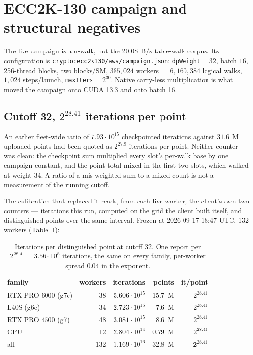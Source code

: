 \section{ECC2K-130 campaign and structural negatives}
\label{sec:campaign}

The live campaign is a $\sigma$-walk, not the $20.08$~B/s table-walk
corpus. Its configuration is \texttt{crypto:ecc2k130/aws/campaign.json}:
\texttt{dpWeight}${}=32$, batch $16$, 256-thread blocks, two blocks/SM,
$385{,}024$ workers ${}=6{,}160{,}384$ logical walks, $1{,}024$
steps/launch, \texttt{maxIters}${}=2^{30}$. Native carry-less
multiplication is what moved the campaign onto CUDA 13.3 and onto
batch 16.

\subsection{Cutoff 32, $2^{28.41}$ iterations per point}

An earlier fleet-wide ratio of $7.93\cdot 10^{15}$ checkpointed
iterations against $31.6$~M uploaded points had been quoted as
$2^{27.9}$ iterations per point. Neither counter was clean: the
checkpoint sum multiplied every slot's per-walk base by one campaign
constant, and the point total mixed in the first two slots, which
walked at weight 34. A ratio of a mis-weighted sum to a mixed count
is not a measurement of the running cutoff.

The calibration that replaced it reads, from each live worker, the
client's own two counters --- iterations this run, computed on the
grid the client built itself, and distinguished points over the same
interval. Frozen at 2026-09-17 18:47 UTC, 132 workers
(Table~\ref{tab:cutoff}):

\begin{table}[t]
\centering
\small
\caption{Iterations per distinguished point at cutoff 32. One report
  per $2^{28.41}=3.56\cdot 10^8$ iterations, the same on every family,
  per-worker spread $0.04$ in the exponent.}
\label{tab:cutoff}
\begin{tabular}{@{}lrrrr@{}}
\toprule
family & workers & iterations & points & it/point \\
\midrule
RTX PRO 6000 (g7e) & 38 & $5.606\cdot 10^{15}$ & 15.7~M & $2^{28.41}$ \\
L40S (g6e) & 34 & $2.723\cdot 10^{15}$ & 7.6~M & $2^{28.41}$ \\
RTX PRO 4500 (g7) & 48 & $3.081\cdot 10^{15}$ & 8.6~M & $2^{28.41}$ \\
CPU & 12 & $2.804\cdot 10^{14}$ & 0.79~M & $2^{28.41}$ \\
all & 132 & $1.169\cdot 10^{16}$ & 32.8~M & $\mathbf{2^{28.41}}$ \\
\bottomrule
\end{tabular}
\end{table}


